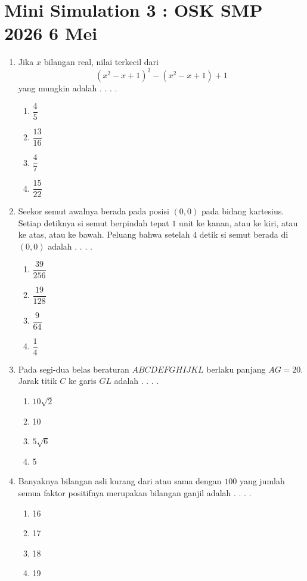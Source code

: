 \documentclass[11pt, a4paper]{scrartcl}
\begin{document}
\section*{Mini Simulation 3 : OSK SMP 2026 6 Mei}
\begin{enumerate}
    \item Jika $x$ bilangan real, nilai terkecil dari
    $$\left (x^2-x+1\right )^2 -\left (x^2-x+1\right )+1$$
    yang mungkin adalah . . . .
    \begin{enumerate}[label={(\Alph*)}]
        \item $\dfrac{4}{5}$ \item $\dfrac{13}{16}$ \item $\dfrac{4}{7}$ \item $\dfrac{15}{22}$
    \end{enumerate}

    \item Seekor semut awalnya berada pada posisi $(0, 0)$ pada bidang kartesius. Setiap detiknya si semut berpindah tepat $1$ unit ke kanan, atau ke kiri, atau ke atas, atau ke bawah. Peluang bahwa setelah $4$ detik si semut berada di $(0, 0)$ adalah . . . .
    \begin{enumerate}[label={(\Alph*)}]
        \item $\dfrac{39}{256}$ \item $\dfrac{19}{128}$ \item $\dfrac{9}{64}$ \item $\dfrac{1}{4}$
    \end{enumerate}

    \item Pada segi-dua belas beraturan $ABCDEFGHIJKL$ berlaku panjang $AG=20$. Jarak titik $C$ ke garis $GL$ adalah . . . .
    \begin{enumerate}[label={(\Alph*)}]
        \item $10\sqrt{2}$ \item 10 \item $5\sqrt{6}$ \item 5
    \end{enumerate}

    \item Banyaknya bilangan asli kurang dari atau sama dengan $100$ yang jumlah semua faktor positifnya merupakan bilangan ganjil adalah . . . .
    \begin{enumerate}[label={(\Alph*)}]
        \item 16 \item 17 \item 18 \item 19
    \end{enumerate}


\end{enumerate}
\end{document}
